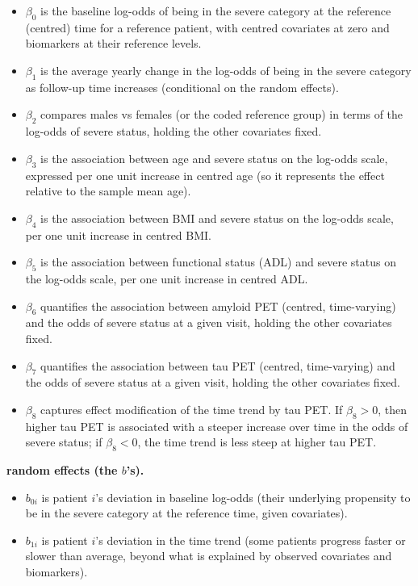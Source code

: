 \documentclass[
  9pt,
  letterpaper,
  DIV=11,
  numbers=noendperiod]{scrartcl}
\providecommand{\tightlist}{%
  \setlength{\itemsep}{0pt}\setlength{\parskip}{0pt}}
\begin{document}
\begin{itemize}
\tightlist
\item
  \(\beta_0\) is the baseline log-odds of being in the severe category
  at the reference (centred) time for a reference patient, with centred
  covariates at zero and biomarkers at their reference levels.
\item
  \(\beta_1\) is the average yearly change in the log-odds of being in
  the severe category as follow-up time increases (conditional on the
  random effects).
\item
  \(\beta_2\) compares males vs females (or the coded reference group)
  in terms of the log-odds of severe status, holding the other
  covariates fixed.
\item
  \(\beta_3\) is the association between age and severe status on the
  log-odds scale, expressed per one unit increase in centred age (so it
  represents the effect relative to the sample mean age).
\item
  \(\beta_4\) is the association between BMI and severe status on the
  log-odds scale, per one unit increase in centred BMI.
\item
  \(\beta_5\) is the association between functional status (ADL) and
  severe status on the log-odds scale, per one unit increase in centred
  ADL.
\item
  \(\beta_6\) quantifies the association between amyloid PET (centred,
  time-varying) and the odds of severe status at a given visit, holding
  the other covariates fixed.
\item
  \(\beta_7\) quantifies the association between tau PET (centred,
  time-varying) and the odds of severe status at a given visit, holding
  the other covariates fixed.
\item
  \(\beta_8\) captures effect modification of the time trend by tau PET.
  If \(\beta_8>0\), then higher tau PET is associated with a steeper
  increase over time in the odds of severe status; if \(\beta_8<0\), the
  time trend is less steep at higher tau PET.
\end{itemize}

\textbf{random effects (the \(b\)'s).}

\begin{itemize}
\tightlist
\item
  \(b_{0i}\) is patient \(i\)'s deviation in baseline log-odds (their
  underlying propensity to be in the severe category at the reference
  time, given covariates).
\item
  \(b_{1i}\) is patient \(i\)'s deviation in the time trend (some
  patients progress faster or slower than average, beyond what is
  explained by observed covariates and biomarkers).
\end{itemize}
\end{document}
